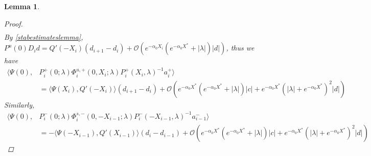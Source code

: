 \documentclass[10pt,reqno]{amsart}
\theoremstyle{plain}
\newtheorem{lemma}[theorem]{Lemma}
\theoremstyle{definition}
\theoremstyle{remark}
\numberwithin{theorem}{section}
\numberwithin{equation}{section}
\begin{document}
\begin{lemma}
\begin{proof}
\begin{align*}
\end{align*}
By \cref{stabestimateslemma}, $P^u(0) D_i d = Q'(-X_i)(d_{i+1} - d_i ) + \mathcal{O}( e^{-\alpha_0 X_i} (e^{-\alpha_0 X^*} + |\lambda| )|d|)$, thus we have
\begin{align*}
\langle \Psi(0), &P_i^+(0; \lambda) \Phi_i^{u,+}(0, X_i; \lambda) P_i^+(X_i, \lambda)^{-1} a_i^+ \rangle \\
&= \langle \Psi(X_i), Q'(-X_i) \rangle (d_{i+1} - d_i ) + \mathcal{O}\left(e^{-\alpha_0 X^*} (e^{-\alpha_0 X^*} + |\lambda|)|c| + e^{-\alpha_0 X^*}(|\lambda| + e^{-\alpha_0 X^*})^2 |d|  \right)
\end{align*}
Similarly,
\begin{align*}
\langle \Psi(0), &P_i^-(0; \lambda) \Phi_i^{s,-}(0, -X_{i-1}; \lambda) P_i^-(-X_{i-1}, \lambda)^{-1} a_{i-1}^- \rangle \\
&= -\langle \Psi(-X_{i-1}), Q'(X_{i-1}) \rangle (d_i - d_{i-1} )
+ \mathcal{O}\left(e^{-\alpha_0 X^*} (e^{-\alpha_0 X^*} + |\lambda|)|c| + e^{-\alpha_0 X^*}(|\lambda| + e^{-\alpha_0 X^*})^2 |d|  \right)
\end{align*}


\end{proof}
\end{lemma}
\end{document}
